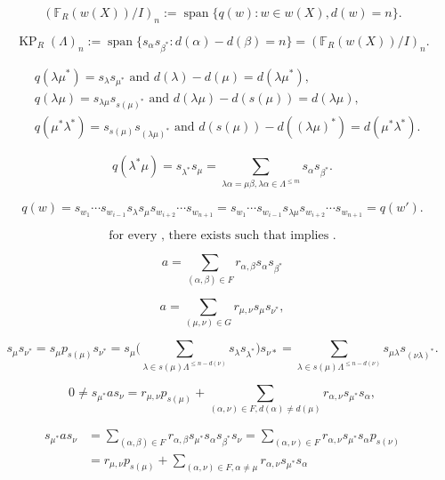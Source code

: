 \documentclass[a4paper,12pt]{article}
\begin{document}
\[
({\mathbb{F}}_R(w(X))/I)_n:={\operatorname{\mathrm{span}}} \{ q(w):w\in w(X),  d(w)=n \}.
\]

\[
\operatorname{KP}_R(\Lambda)_n :=  {\operatorname{\mathrm{span}}}\{s_\alpha s_{\beta^{*}}: d(\alpha)-d(\beta)=n\}=({\mathbb{F}}_R(w(X))/I)_n.
\]

\begin{align*}
& q(\lambda\mu^*)=s_\lambda s_{\mu^*}\text{\ and \ } d(\lambda)-d(\mu)=d(\lambda\mu^*),\\
& q(\lambda\mu)=s_{\lambda\mu} s_{s(\mu)^*}\text{\ and \ } d(\lambda\mu)-d(s(\mu))=d(\lambda\mu),\\
& q(\mu^*\lambda^*)=s_{s(\mu)}s_{(\lambda\mu)^*}\text{\ and \ } d(s(\mu))-d((\lambda\mu)^*)=d(\mu^*\lambda^*).
 \end{align*}

\[
 q(\lambda^*\mu)=s_{\lambda^{*}}s_\mu=\sum_{\lambda\alpha=\mu\beta, 
\lambda\alpha \in \Lambda^{\leq m}} s_\alpha s_{\beta^{*}}.
 \]

\[
q(w)=s_{w_1}\cdots s_{w_{i-1}}s_{\lambda}s_{\mu}s_{w_{i+2}}\cdots s_{w_{n+1}}
=s_{w_1}\cdots s_{w_{i-1}}s_{\lambda\mu}s_{w_{i+2}}\cdots s_{w_{n+1}}=q(w').
\]

\begin{equation}\label{eq:aperiodic}
\text{for every , there exists 
such that   implies .}
\end{equation}

\[ a = \sum_{(\alpha, \beta) \in F} r_{\alpha, \beta}s_\alpha s_{\beta^{*}}\]

\[a=\sum_{(\mu,\nu) \in G} r_{\mu,\nu}s_\mu s_{\nu^{*}},\]

\[
s_\mu s_{\nu^{*}} = s_\mu p_{s(\mu)} s_{\nu^{*}}=s_\mu\Big(\sum_{\lambda \in s(\mu)\Lambda^{\leq n-d(\nu)}} s_\lambda s_{\lambda^{*}}\Big) s_{\nu{*}}=\sum_{\lambda \in s(\mu)\Lambda^{\leq n-d(\nu)}}s_{\mu\lambda} s_{(\nu\lambda)^{*}}.
\]

\begin{equation}\label{eq:4.2}
0 \neq s_{\mu^*}as_\nu = r_{\mu,\nu}p_{s(\mu)}+\sum_{(\alpha,\nu)\in F, d(\alpha)\neq d(\mu)} 
r_{\alpha,\nu}s_{\mu^*}s_\alpha,\end{equation}

\begin{align*}
s_{\mu^*}as_\nu 
&=\sum_{(\alpha,\beta) \in F} r_{\alpha,\beta}s_{\mu^*}s_\alpha s_{\beta^*} s_\nu 
=\sum_{(\alpha,\nu) \in F} r_{\alpha,\nu}s_{\mu^*}s_\alpha p_{s(\nu)}\\
&= r_{\mu,\nu}p_{s(\mu)}+\sum_{(\alpha,\nu) \in F, \alpha\neq\mu } r_{\alpha,\nu}s_{\mu^*}s_\alpha
\end{align*}
\end{document}
